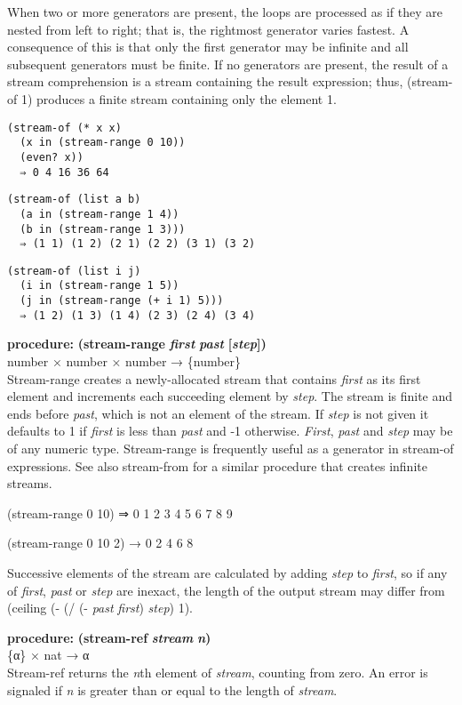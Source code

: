 When two or more generators are present, the loops are processed as if
they are nested from left to right; that is, the rightmost generator
varies fastest. A consequence of this is that only the first generator
may be infinite and all subsequent generators must be finite. If no
generators are present, the result of a stream comprehension is a stream
containing the result expression; thus, (stream-of 1) produces a finite
stream containing only the element 1.

\begin{verbatim}
(stream-of (* x x)
  (x in (stream-range 0 10))
  (even? x))
  ⇒ 0 4 16 36 64
\end{verbatim}

\begin{verbatim}
(stream-of (list a b)
  (a in (stream-range 1 4))
  (b in (stream-range 1 3))) 
  ⇒ (1 1) (1 2) (2 1) (2 2) (3 1) (3 2)
\end{verbatim}

\begin{verbatim}
(stream-of (list i j)
  (i in (stream-range 1 5))
  (j in (stream-range (+ i 1) 5)))
  ⇒ (1 2) (1 3) (1 4) (2 3) (2 4) (3 4)
\end{verbatim}

\textbf{procedure:} \textbf{(stream-range} \textbf{\emph{first}}
\textbf{} \textbf{\emph{past}} \textbf{{[}\emph{step}{]})}\\
number × number × number → \{number\}\\
Stream-range creates a newly-allocated stream that contains \emph{first}
as its first element and increments each succeeding element by
\emph{step}. The stream is finite and ends before \emph{past}, which is
not an element of the stream. If \emph{step} is not given it defaults to
1 if \emph{first} is less than \emph{past} and -1 otherwise.
\emph{First}, \emph{past} and \emph{step} may be of any numeric type.
Stream-range is frequently useful as a generator in stream-of
expressions. See also stream-from for a similar procedure that creates
infinite streams.

(stream-range 0 10) ⇒ 0 1 2 3 4 5 6 7 8 9

(stream-range 0 10 2) → 0 2 4 6 8

Successive elements of the stream are calculated by adding \emph{step}
to \emph{first}, so if any of \emph{first}, \emph{past} or \emph{step}
are inexact, the length of the output stream may differ from (ceiling (-
(/ (- \emph{past} \emph{first}) \emph{step}) 1).

\textbf{procedure:} \textbf{(stream-ref} \textbf{\emph{stream}}
\textbf{} \textbf{\emph{n})}\\
\{α\} × nat → α\\
Stream-ref returns the \emph{n}th element of \emph{stream}, counting
from zero. An error is signaled if \emph{n} is greater than or equal to
the length of \emph{stream}.

